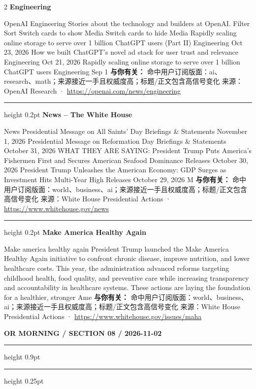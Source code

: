\documentclass[10.5pt]{ctexart}
\begin{document}
\begin{multicols}{2}
{\large\bfseries Engineering}\par
OpenAI Engineering Stories about the technology and builders at OpenAI. Filter Sort Switch cards to show Media Switch cards to hide Media Rapidly scaling online storage to serve over 1 billion ChatGPT users (Part II) Engineering Oct 23, 2026 How we built ChatGPT’s novel ad stack for user trust and relevance Engineering Oct 21, 2026 Rapidly scaling online storage to serve over 1 billion ChatGPT users Engineering Sep 1
\textbf{与你有关：} 命中用户订阅版面：ai、research、math；来源接近一手且权威度高；标题/正文包含高信号变化
{\footnotesize\color{ormuted} 来源：OpenAI Research · \url{https://openai.com/news/engineering}}
\vspace{2mm}
\hrule height 0.2pt
\vspace{2mm}
{\large\bfseries News – The White House}\par
News Presidential Message on All Saints’ Day Briefings \& Statements November 1, 2026 Presidential Message on Reformation Day Briefings \& Statements October 31, 2026 WHAT THEY ARE SAYING: President Trump Puts America’s Fishermen First and Secures American Seafood Dominance Releases October 30, 2026 President Trump Unleashes the American Economy: GDP Surges as Investment Hits Multi-Year High Releases October 29, 2026 M
\textbf{与你有关：} 命中用户订阅版面：world、business、ai；来源接近一手且权威度高；标题/正文包含高信号变化
{\footnotesize\color{ormuted} 来源：White House Presidential Actions · \url{https://www.whitehouse.gov/news}}
\vspace{2mm}
\hrule height 0.2pt
\vspace{2mm}
{\large\bfseries Make America Healthy Again}\par
Make america healthy again President Trump launched the Make America Healthy Again initiative to confront chronic disease, improve nutrition, and lower healthcare costs. This year, the administration advanced reforms targeting childhood health, food quality, and preventive care while increasing transparency and accountability in healthcare systems. These actions are laying the foundation for a healthier, stronger Ame
\textbf{与你有关：} 命中用户订阅版面：world、business、ai；来源接近一手且权威度高；标题/正文包含高信号变化
{\footnotesize\color{ormuted} 来源：White House Presidential Actions · \url{https://www.whitehouse.gov/issues/maha}}
\end{multicols}
\newpage
{\small\bfseries OR MORNING / SECTION 08 / 2026-11-02}
\vspace{2mm}
\hrule height 0.9pt
\vspace{1.5mm}
\hrule height 0.25pt
\vspace{4mm}
\end{document}

